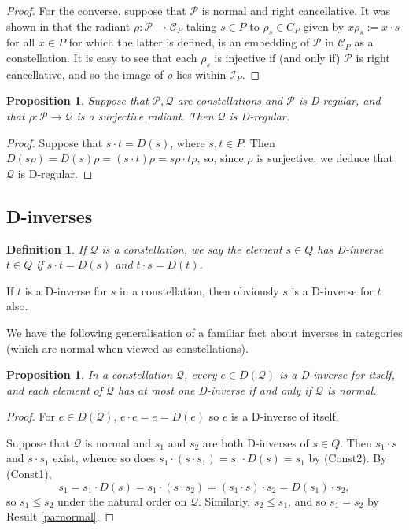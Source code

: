 \documentclass[12pt]{amsart}
\newtheorem{pro}[thm]{Proposition}
\newtheorem{dfn}[thm]{Definition}
\theoremstyle{definition}
\newcommand{\Pcon}{\mathcal P}
\newcommand{\Q}{\mathcal Q}
\newcommand{\C}{\mathcal C}
\newcommand{\I}{\mathcal I}
\begin{document}
{\begin{proof}
For the converse, suppose that $\Pcon$ is normal and right cancellative.
It was shown in \cite{constgen} that the radiant $\rho:\Pcon\rightarrow \C_P$ taking $s\in P$ to $\rho_s\in C_P$ given by $x\rho_s:=x\cdot s$ for all $x\in P$ for which the latter is defined, is an embedding of $\Pcon$ in $\C_P$ as a constellation.  It is easy to see that each $\rho_s$ is injective if (and only if) $\Pcon$ is right cancellative, and so the image of 
 $\rho$ lies within $\I_P$.
\end{proof}


\begin{pro}  \label{Dregim}
Suppose that $\Pcon,\Q$ are constellations and $\Pcon$ is D-regular, and that $\rho: \Pcon\rightarrow \Q$ is a surjective radiant. Then $\Q$ is D-regular.
\end{pro}
\begin{proof}
Suppose that $s\cdot t=D(s)$, where $s,t\in P$.  Then $D(s\rho)=D(s)\rho=(s\cdot t)\rho=s\rho\cdot t\rho$, so, since $\rho$ is surjective, 
we deduce that $\Q$ is D-regular.
\end{proof} 

\subsection{D-inverses}\label{sub:dinv}


\begin{dfn}
If $\Q$ is a constellation, we say the element $s\in Q$ has {\em D-inverse} $t\in Q$ if $s\cdot t=D(s)$ and $t\cdot s=D(t)$.  
\end{dfn}  

If $t$ is a D-inverse for $s$ in a constellation, then obviously $s$ is a D-inverse for $t$ also. 

We have the following generalisation of a familiar fact about inverses in categories (which are normal when viewed as constellations).

\begin{pro}  \label{normunique}
In a constellation $\Q$, every $e\in D(\Q)$ is a D-inverse for itself, and each element of $\Q$ has at most one D-inverse if and only if $\Q$ is normal.
\end{pro}
\begin{proof}  
For $e\in D(\Q)$, $e\cdot e=e=D(e)$ so $e$ is a D-inverse of itself.

Suppose that $\Q$ is normal and $s_1$ and $s_2$ are both D-inverses of $s\in Q$.  Then $s_1\cdot s$ and $s\cdot s_1$ exist, whence so does $s_1\cdot(s\cdot s_1)=s_1\cdot D(s)=s_1$ by (Const2).  By (Const1), 
$$s_1 =s_1\cdot D(s)=s_1\cdot (s\cdot s_2)=(s_1\cdot s)\cdot s_2=D(s_1)\cdot s_2,$$
so $s_1\leq s_2$ under the natural order on $\Q$.  Similarly, $s_2\leq s_1$, and so $s_1=s_2$ by Result \ref{parnormal}.


\end{proof}}
\end{document}
